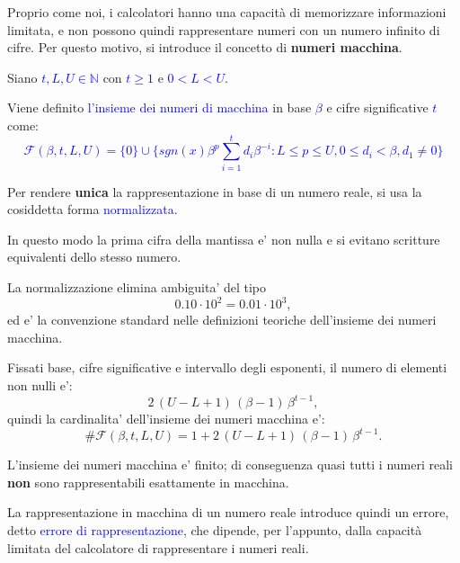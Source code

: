 Proprio come noi, i calcolatori hanno una capacità di memorizzare informazioni limitata, e non possono quindi rappresentare numeri con un numero infinito di cifre.
Per questo motivo, si introduce il concetto di \textbf{numeri macchina}.

\begin{defi}
Siano \textcolor{blue}{$t, L, U \in \mathbb{N}$} con \textcolor{blue}{$t \geq 1$} e \textcolor{blue}{$0 < L < U$}.

Viene definito \textcolor{blue}{l'insieme dei numeri di macchina} in base \textcolor{blue}{$\beta$} e cifre significative \textcolor{blue}{$t$} come:
\textcolor{blue}{\[
\mathcal{F}(\beta, t, L, U) = \{0\} \cup \{sgn(x) \beta^p \sum_{i=1}^{t} d_i \beta^{-i} : L \leq p \leq U, 0 \leq d_i < \beta, d_1 \neq 0\}
\]}
\end{defi}

Per rendere \textbf{unica} la rappresentazione in base di un numero reale,
si usa la cosiddetta forma \textcolor{blue}{normalizzata}.

In questo modo la prima cifra della mantissa e' non nulla e si evitano scritture equivalenti
dello stesso numero.

\begin{obs}
La normalizzazione elimina ambiguita' del tipo
\[
0.10\cdot 10^2 = 0.01\cdot 10^3,
\]
ed e' la convenzione standard nelle definizioni teoriche dell'insieme dei numeri macchina.
\end{obs}

\begin{prop}
Fissati base, cifre significative e intervallo degli esponenti, il numero di elementi non nulli e':
\[
2\,(U-L+1)\,(\beta-1)\,\beta^{t-1},
\]
quindi la cardinalita' dell'insieme dei numeri macchina e':
\[
\#\mathcal{F}(\beta,t,L,U)=1+2\,(U-L+1)\,(\beta-1)\,\beta^{t-1}.
\]
\end{prop}

\begin{obs}[Conseguenza]
L'insieme dei numeri macchina e' finito; di conseguenza quasi tutti i numeri reali
\textbf{non} sono rappresentabili esattamente in macchina.
\end{obs}

La rappresentazione in macchina di un numero reale introduce quindi un errore, detto
\textcolor{blue}{errore di rappresentazione}, che dipende, per l'appunto, dalla capacità limitata del calcolatore di rappresentare i numeri reali.

